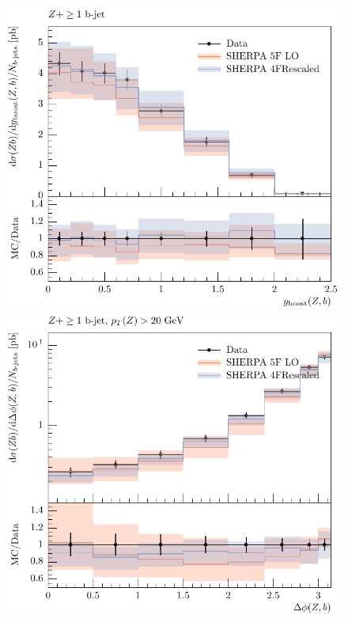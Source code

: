 \documentclass[11pt]{cernrep}
\begin{document}
\begin{figure}[htbp]
\begin{center}
   \includegraphics[scale=0.65]{figs/zbb/sherpa/d07-x01-y01_rescaled.pdf}
   \includegraphics[scale=0.65]{figs/zbb/sherpa/d11-x01-y01_rescaled.pdf} \\

\end{center}
\end{figure}
\end{document}
